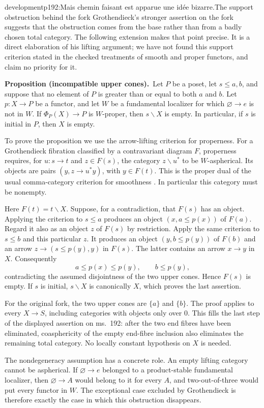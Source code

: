 \begin{dcomment}{development}{p192:Mais chemin faisant est apparue une idée bizarre.}{The support obstruction behind the fork}
Grothendieck's stronger assertion on the fork suggests that the obstruction comes from the base rather than from a badly chosen total category. The following extension makes that point precise. It is a direct elaboration of his lifting argument; we have not found this support criterion stated in the checked treatments of smooth and proper functors, and claim no priority for it.

\textbf{Proposition (incompatible upper cones).}\ours\
Let $P$ be a poset, let $s\leq a,b$, and suppose that no element of $P$ is greater than or equal to both $a$ and $b$. Let $p:X\to P$ be a functor, and let $W$ be a fundamental localizer for which $\varnothing\to e$ is not in $W$. If $\Phi_P(X)\to P$ is $W$-proper, then $s\backslash X$ is empty. In particular, if $s$ is initial in $P$, then $X$ is empty.

To prove the proposition we use the arrow-lifting criterion for properness. For a Grothendieck fibration classified by a contravariant diagram $F$, properness requires, for $u:s\to t$ and $z\in F(s)$, the category $z\backslash u^*$ to be $W$-aspherical. Its objects are pairs $(y,z\to u^*y)$, with $y\in F(t)$. This is the proper dual of the usual comma-category criterion for smoothness \citep[Theorem~4.13 and Example~4.17]{Maltsiniotis2005Asphericite}. In particular this category must be nonempty.

Here $F(t)=t\backslash X$. Suppose, for a contradiction, that $F(s)$ has an object. Applying the criterion to $s\leq a$ produces an object $(x,a\leq p(x))$ of $F(a)$. Regard it also as an object $z$ of $F(s)$ by restriction. Apply the same criterion to $s\leq b$ and this particular $z$. It produces an object $(y,b\leq p(y))$ of $F(b)$ and an arrow $z\to (s\leq p(y),y)$ in $F(s)$. The latter contains an arrow $x\to y$ in $X$. Consequently
\[
a\leq p(x)\leq p(y),\qquad b\leq p(y),
\]
contradicting the assumed disjointness of the two upper cones. Hence $F(s)$ is empty. If $s$ is initial, $s\backslash X$ is canonically $X$, which proves the last assertion.

For the original fork, the two upper cones are $\{a\}$ and $\{b\}$. The proof applies to every $X\to S$, including categories with objects only over $0$. This fills the last step of the displayed assertion on ms.~192: after the two end fibres have been eliminated, coasphericity of the empty end-fibre inclusion also eliminates the remaining total category. No locally constant hypothesis on $X$ is needed.

The nondegeneracy assumption has a concrete role. An empty lifting category cannot be aspherical. If $\varnothing\to e$ belonged to a product-stable fundamental localizer, then $\varnothing\to A$ would belong to it for every $A$, and two-out-of-three would put every functor in $W$. The exceptional case excluded by Grothendieck is therefore exactly the case in which this obstruction disappears.
\end{dcomment}

